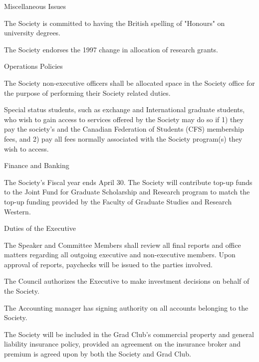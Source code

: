 \begin{longenum}[label*=\thesection.\arabic*., align=left]
\begin{longenum}[label*=\arabic*., align=left]
\begin{longenum}[label*=\arabic*., align=left]
\end{longenum}
\item Miscellaneous Issues
\begin{longenum}[label*=\arabic*., align=left]
\item The Society is committed to having the British spelling of "Honours" on university degrees.
\item The Society endorses the 1997 change in allocation of research grants.
\end{longenum}
\item Operations Policies
\begin{longenum}[label*=\arabic*., align=left]
\item The Society non-executive officers shall be allocated space in the Society office for the purpose of performing their Society related duties.
\item Special status students, such as exchange and International graduate students, who wish to gain access to services offered by the Society may do so if 1) they pay the society's and the Canadian Federation of Students (CFS) membership fees, and 2) pay all fees normally associated with the Society program(s) they wish to access.
\end{longenum}
\item Finance and Banking
\begin{longenum}[label*=\arabic*., align=left]
\item The Society's Fiscal year ends April 30.
The Society will contribute top-up funds to the Joint Fund for Graduate Scholarship and Research program to match the top-up funding provided by the Faculty of Graduate Studies and Research Western.
\end{longenum}
\item Duties of the Executive
\begin{longenum}[label*=\arabic*., align=left]
\item The Speaker and Committee Members shall review all final reports and office matters regarding all outgoing executive and non-executive members. Upon approval of reports, paychecks will be issued to the parties involved.
\item The Council authorizes the Executive to make investment decisions on behalf of the Society.
\item The Accounting manager has signing authority on all accounts belonging to the Society.
\item The Society will be included in the Grad Club's commercial property and general liability insurance policy, provided an agreement on the insurance broker and premium is agreed upon by both the Society and Grad Club.

\end{longenum}
\end{longenum}
\end{longenum}
